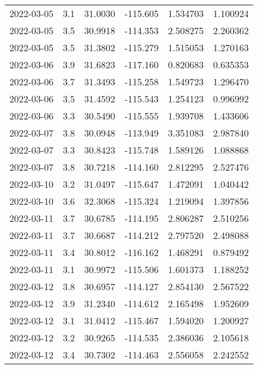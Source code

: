 \begin{tabular}{lrrrrr}
2022-03-05 &       3.1 &  31.0030 &  -115.605 &         1.534703 &         1.100924 \\
2022-03-05 &       3.5 &  30.9918 &  -114.353 &         2.508275 &         2.260362 \\
2022-03-05 &       3.5 &  31.3802 &  -115.279 &         1.515053 &         1.270163 \\
2022-03-06 &       3.9 &  31.6823 &  -117.160 &         0.820683 &         0.635353 \\
2022-03-06 &       3.7 &  31.3493 &  -115.258 &         1.549723 &         1.296470 \\
2022-03-06 &       3.5 &  31.4592 &  -115.543 &         1.254123 &         0.996992 \\
2022-03-06 &       3.3 &  30.5490 &  -115.555 &         1.939708 &         1.433606 \\
2022-03-07 &       3.8 &  30.0948 &  -113.949 &         3.351083 &         2.987840 \\
2022-03-07 &       3.3 &  30.8423 &  -115.748 &         1.589126 &         1.088868 \\
2022-03-07 &       3.8 &  30.7218 &  -114.160 &         2.812295 &         2.527476 \\
2022-03-10 &       3.2 &  31.0497 &  -115.647 &         1.472091 &         1.040442 \\
2022-03-10 &       3.6 &  32.3068 &  -115.324 &         1.219094 &         1.397856 \\
2022-03-11 &       3.7 &  30.6785 &  -114.195 &         2.806287 &         2.510256 \\
2022-03-11 &       3.7 &  30.6687 &  -114.212 &         2.797520 &         2.498088 \\
2022-03-11 &       3.4 &  30.8012 &  -116.162 &         1.468291 &         0.879492 \\
2022-03-11 &       3.1 &  30.9972 &  -115.506 &         1.601373 &         1.188252 \\
2022-03-12 &       3.8 &  30.6957 &  -114.127 &         2.854130 &         2.567522 \\
2022-03-12 &       3.9 &  31.2340 &  -114.612 &         2.165498 &         1.952609 \\
2022-03-12 &       3.1 &  31.0412 &  -115.467 &         1.594020 &         1.200927 \\
2022-03-12 &       3.2 &  30.9265 &  -114.535 &         2.386036 &         2.105618 \\
2022-03-12 &       3.4 &  30.7302 &  -114.463 &         2.556058 &         2.242552 \\

\end{tabular}
